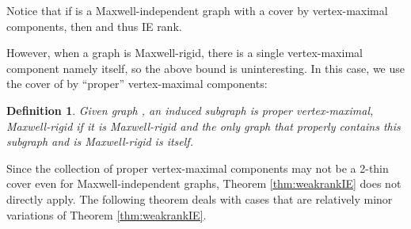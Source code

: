 \documentclass[10pt]{article}
\newtheorem{dfn}{Definition}
\begin{document}
Notice that if  is a Maxwell-independent graph with a cover     by vertex-maximal components, then    and thus        IE  rank.


However, when a graph  is Maxwell-rigid, there is a single vertex-maximal component namely  itself, so the above bound is uninteresting. In this case, we use the cover of  by ``proper'' vertex-maximal components:

\begin{dfn}\label{dfn:properMax}
Given graph , an induced subgraph is \emph{proper vertex-maximal, Maxwell-rigid} if it is Maxwell-rigid and the only graph that properly contains this
subgraph and is Maxwell-rigid is  itself.
\end{dfn}

\noindent Since the collection of proper vertex-maximal components may not be a 2-thin cover even for Maxwell-independent graphs, Theorem \ref{thm:weakrankIE} does not directly apply. The following theorem deals with cases that are relatively minor variations of Theorem \ref{thm:weakrankIE}.
\end{document}
